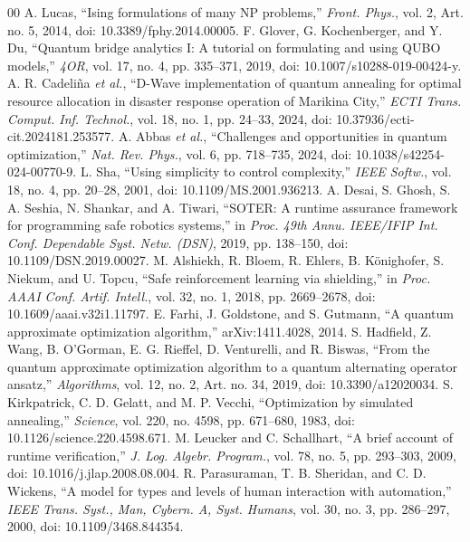 \documentclass[conference]{IEEEtran}
\begin{document}
\balance
\begin{thebibliography}{00}
 A. Lucas, ``Ising formulations of many NP problems,'' \textit{Front. Phys.}, vol. 2, Art. no. 5, 2014, doi: 10.3389/fphy.2014.00005.
 F. Glover, G. Kochenberger, and Y. Du, ``Quantum bridge analytics I: A tutorial on formulating and using QUBO models,'' \textit{4OR}, vol. 17, no. 4, pp. 335--371, 2019, doi: 10.1007/s10288-019-00424-y.
 A. R. Cadeli\~{n}a \textit{et al.}, ``D-Wave implementation of quantum annealing for optimal resource allocation in disaster response operation of Marikina City,'' \textit{ECTI Trans. Comput. Inf. Technol.}, vol. 18, no. 1, pp. 24--33, 2024, doi: 10.37936/ecti-cit.2024181.253577.
 A. Abbas \textit{et al.}, ``Challenges and opportunities in quantum optimization,'' \textit{Nat. Rev. Phys.}, vol. 6, pp. 718--735, 2024, doi: 10.1038/s42254-024-00770-9.
 L. Sha, ``Using simplicity to control complexity,'' \textit{IEEE Softw.}, vol. 18, no. 4, pp. 20--28, 2001, doi: 10.1109/MS.2001.936213.
 A. Desai, S. Ghosh, S. A. Seshia, N. Shankar, and A. Tiwari, ``SOTER: A runtime assurance framework for programming safe robotics systems,'' in \textit{Proc. 49th Annu. IEEE/IFIP Int. Conf. Dependable Syst. Netw. (DSN)}, 2019, pp. 138--150, doi: 10.1109/DSN.2019.00027.
 M. Alshiekh, R. Bloem, R. Ehlers, B. K\"{o}nighofer, S. Niekum, and U. Topcu, ``Safe reinforcement learning via shielding,'' in \textit{Proc. AAAI Conf. Artif. Intell.}, vol. 32, no. 1, 2018, pp. 2669--2678, doi: 10.1609/aaai.v32i1.11797.
 E. Farhi, J. Goldstone, and S. Gutmann, ``A quantum approximate optimization algorithm,'' arXiv:1411.4028, 2014.
 S. Hadfield, Z. Wang, B. O'Gorman, E. G. Rieffel, D. Venturelli, and R. Biswas, ``From the quantum approximate optimization algorithm to a quantum alternating operator ansatz,'' \textit{Algorithms}, vol. 12, no. 2, Art. no. 34, 2019, doi: 10.3390/a12020034.
 S. Kirkpatrick, C. D. Gelatt, and M. P. Vecchi, ``Optimization by simulated annealing,'' \textit{Science}, vol. 220, no. 4598, pp. 671--680, 1983, doi: 10.1126/science.220.4598.671.
 M. Leucker and C. Schallhart, ``A brief account of runtime verification,'' \textit{J. Log. Algebr. Program.}, vol. 78, no. 5, pp. 293--303, 2009, doi: 10.1016/j.jlap.2008.08.004.
 R. Parasuraman, T. B. Sheridan, and C. D. Wickens, ``A model for types and levels of human interaction with automation,'' \textit{IEEE Trans. Syst., Man, Cybern. A, Syst. Humans}, vol. 30, no. 3, pp. 286--297, 2000, doi: 10.1109/3468.844354.

\end{thebibliography}
\end{document}
